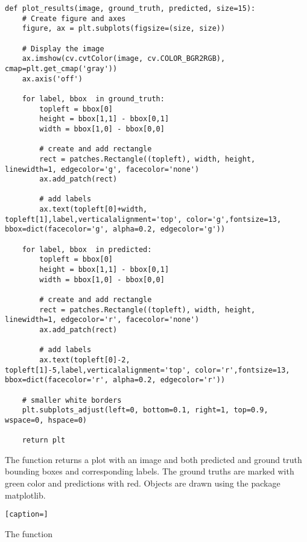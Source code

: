 \begin{lstlisting}[caption=plot\_results]
def plot_results(image, ground_truth, predicted, size=15):
    # Create figure and axes
    figure, ax = plt.subplots(figsize=(size, size))

    # Display the image
    ax.imshow(cv.cvtColor(image, cv.COLOR_BGR2RGB), cmap=plt.get_cmap('gray'))
    ax.axis('off')

    for label, bbox  in ground_truth:
        topleft = bbox[0]
        height = bbox[1,1] - bbox[0,1]
        width = bbox[1,0] - bbox[0,0]

        # create and add rectangle
        rect = patches.Rectangle((topleft), width, height, linewidth=1, edgecolor='g', facecolor='none')
        ax.add_patch(rect)

        # add labels
        ax.text(topleft[0]+width, topleft[1],label,verticalalignment='top', color='g',fontsize=13, bbox=dict(facecolor='g', alpha=0.2, edgecolor='g'))

    for label, bbox  in predicted:
        topleft = bbox[0]
        height = bbox[1,1] - bbox[0,1]
        width = bbox[1,0] - bbox[0,0]

        # create and add rectangle
        rect = patches.Rectangle((topleft), width, height, linewidth=1, edgecolor='r', facecolor='none')
        ax.add_patch(rect)

        # add labels
        ax.text(topleft[0]-2, topleft[1]-5,label,verticalalignment='top', color='r',fontsize=13, bbox=dict(facecolor='r', alpha=0.2, edgecolor='r'))
    
    # smaller white borders
    plt.subplots_adjust(left=0, bottom=0.1, right=1, top=0.9, wspace=0, hspace=0)

    return plt 
\end{lstlisting}

The function  returns a plot with an image and both predicted and ground truth bounding boxes 
and corresponding labels. The ground truths are marked with green color and predictions with red. Objects are drawn using the package matplotlib.

\begin{lstlisting}[caption=]

\end{lstlisting}

The function \tn{}